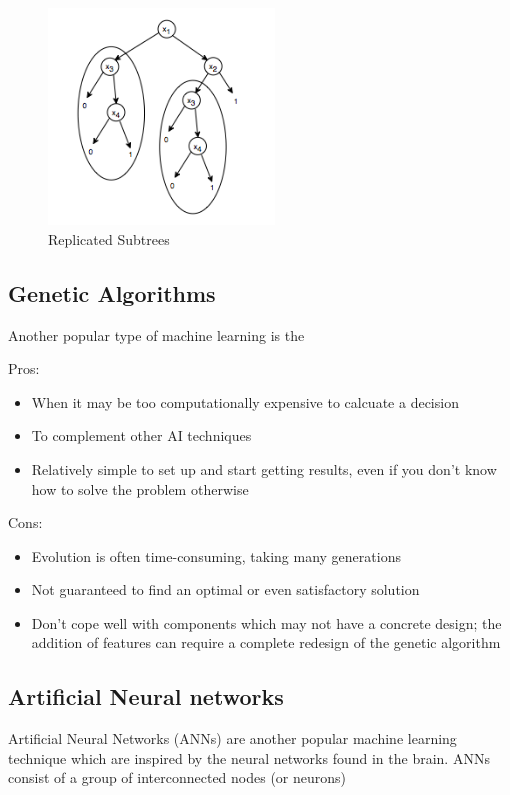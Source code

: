 \documentclass[a4paper,oneside]{report}
\begin{document}
\begin{figure}[h!]
	\centering
		\includegraphics[width=60mm]{sources/images/ReplicatedSubtrees}
    	\caption{Replicated Subtrees}
\end{figure}

\subsection{Genetic Algorithms}

Another popular type of machine learning is the 

Pros:
\begin{itemize}
	\item When it may be too computationally expensive to calcuate a decision
	\item To complement other AI techniques
	\item Relatively simple to set up and start getting results, even if you don't know how to solve the problem otherwise
\end{itemize}

\noindent Cons:
\begin{itemize} 
	\item Evolution is often time-consuming, taking many generations
	\item Not guaranteed to find an optimal or even satisfactory solution
	\item Don't cope well with components which may not have a concrete design; the addition of features can require a complete redesign of the genetic algorithm
\end{itemize}

\subsection{Artificial Neural networks}

Artificial Neural Networks (ANNs) are another popular machine learning technique which are inspired by the neural networks found in the brain. ANNs consist of a group of interconnected nodes (or neurons)
\end{document}
